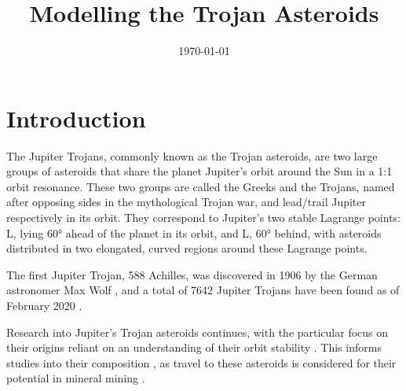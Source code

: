 \documentclass[11pt, a4paper,twocolumn]{article} %
\title{Modelling the Trojan Asteroids}
\author{\authorstyle{Christopher Gallagher} %
	\institution{University of Cambridge}}
\date{\today} %
\begin{document}
\maketitle %

\thispagestyle{firstpage} %





\section{Introduction}
The Jupiter Trojans, commonly known as the Trojan asteroids, are two large groups of asteroids that share the planet Jupiter's orbit around the Sun in a 1:1 orbit resonance. These two groups are called the Greeks and the Trojans, named after opposing sides in the mythological Trojan war, and lead/trail Jupiter respectively in its orbit. They correspond to Jupiter's two stable Lagrange points: L, lying 60° ahead of the planet in its orbit, and L, 60° behind, with asteroids distributed in two elongated, curved regions around these Lagrange points. 

The first Jupiter Trojan, 588 Achilles, was discovered in 1906 by the German astronomer Max Wolf \cite{Nicholson1961}, and a total of 7642 Jupiter Trojans have been found as of February 2020 \cite{IAU2020}.

Research into Jupiter's Trojan asteroids continues, with the particular focus on their origins reliant on an understanding of their orbit stability \cite{DiSisto2019} \cite{Nesvorn2018}. This informs studies into their composition \cite{Brown2016}, as travel to these asteroids is considered for their potential in mineral mining \cite{Okada2017} \cite{Levison2016}. 
\end{document}
